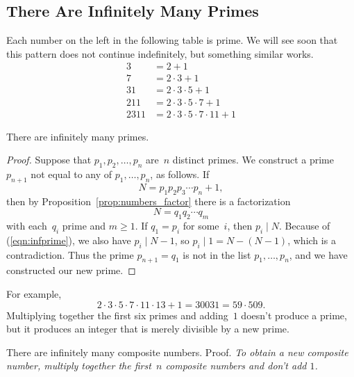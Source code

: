 \subsection{There Are Infinitely Many Primes}\label{sec:inf_primes}
Each number on the left in the following table is prime.
We will see soon that this pattern does not continue
indefinitely, but something similar works.
\begin{align*}
3 &= 2+1\\
7 &= 2\cdot 3 + 1\\
31 &= 2\cdot 3 \cdot 5 + 1\\
211 &= 2\cdot 3 \cdot 5 \cdot 7 + 1\\
2311 &= 2\cdot 3 \cdot 5 \cdot 7 \cdot 11 + 1
\end{align*}

\begin{theorem}[Euclid]\label{thm:euclid_primes}
There are infinitely many primes.
\end{theorem}
\begin{proof}
Suppose that $p_1, p_2, \ldots, p_n$ are~$n$ distinct primes.
We construct a prime $p_{n+1}$ not equal to any of $p_1,\ldots, p_n$,
as follows.  If
\begin{equation}\label{eqn:infprime}
    N=p_1 p_2 p_3 \cdots  p_n + 1,
  \end{equation}
then by Proposition~\ref{prop:numbers_factor} there is a factorization
$$
  N = q_1 q_2 \cdots q_m
$$
with each~$q_i$ prime and $m\geq 1$.
If $q_1 = p_i$ for some~$i$, then $p_i\mid{}N$.
Because of (\ref{eqn:infprime}), we also have
$p_i\mid{}N-1$, so $p_i\mid{} 1=N-(N-1)$, which
is a contradiction.
Thus the prime $p_{n+1} = q_1$ is not in the list $p_1,\ldots, p_n$,
and we have constructed our new prime.
\end{proof}

For example,
$$
 2\cdot 3 \cdot 5 \cdot 7\cdot 11\cdot 13 + 1 = 30031 = 59\cdot 509.
$$
Multiplying together the first six primes and adding~$1$ doesn't
produce a prime, but it produces an integer that is merely
divisible by a new prime.

\begin{joke}
  There are infinitely many composite numbers.  Proof. {\em To obtain
    a new composite number, multiply together the first~$n$ composite
    numbers and don't add $1$.}
\end{joke}



